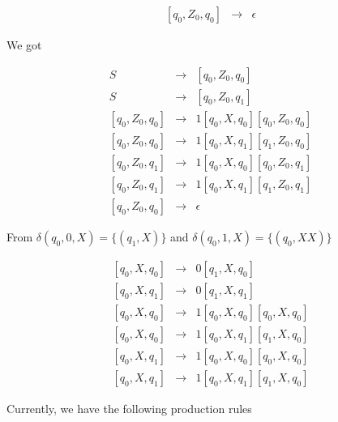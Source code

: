 \begin{eqnarray*}
\left[q_0, Z_0, q_0\right] & \rightarrow & \epsilon 
\end{eqnarray*}

We got

\begin{eqnarray*}
S & \rightarrow & [q_0, Z_0, q_0] \\
S & \rightarrow & [q_0, Z_0, q_1] \\
\left[q_0, Z_0, q_0\right] & \rightarrow & 1[q_0, X, q_0][q_0, Z_0, q_0] \\
\left[q_0, Z_0, q_0\right] & \rightarrow & 1[q_0, X, q_1][q_1, Z_0, q_0] \\
\left[q_0, Z_0, q_1\right] & \rightarrow & 1[q_0, X, q_0][q_0, Z_0, q_1] \\
\left[q_0, Z_0, q_1\right] & \rightarrow & 1[q_0, X, q_1][q_1, Z_0, q_1] \\
\left[q_0, Z_0, q_0\right] & \rightarrow & \epsilon 
\end{eqnarray*}

From $\delta(q_0, 0, X) = \{(q_1, X)\}$ and $\delta(q_0, 1, X) = \{(q_0, XX)\}$

\begin{eqnarray*}
\left[q_0, X, q_0\right] & \rightarrow & 0[q_1, X, q_0] \\
\left[q_0, X, q_1\right] & \rightarrow & 0[q_1, X, q_1] \\
\left[q_0, X, q_0\right] & \rightarrow & 1[q_0, X, q_0][q_0, X, q_0] \\
\left[q_0, X, q_0\right] & \rightarrow & 1[q_0, X, q_1][q_1, X, q_0] \\
\left[q_0, X, q_1\right] & \rightarrow & 1[q_0, X, q_0][q_0, X, q_0] \\
\left[q_0, X, q_1\right] & \rightarrow & 1[q_0, X, q_1][q_1, X, q_0] 
\end{eqnarray*}

Currently, we have the following production rules

